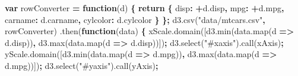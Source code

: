 \documentclass[openany]{book}
\newenvironment{Shaded}{\begin{snugshade}}{\end{snugshade}}
\newcommand{\AttributeTok}[1]{\textcolor[rgb]{0.77,0.63,0.00}{#1}}
\newcommand{\ControlFlowTok}[1]{\textcolor[rgb]{0.13,0.29,0.53}{\textbf{#1}}}
\newcommand{\DataTypeTok}[1]{\textcolor[rgb]{0.13,0.29,0.53}{#1}}
\newcommand{\KeywordTok}[1]{\textcolor[rgb]{0.13,0.29,0.53}{\textbf{#1}}}
\newcommand{\NormalTok}[1]{#1}
\newcommand{\OperatorTok}[1]{\textcolor[rgb]{0.81,0.36,0.00}{\textbf{#1}}}
\newcommand{\StringTok}[1]{\textcolor[rgb]{0.31,0.60,0.02}{#1}}
\newcommand{\VariableTok}[1]{\textcolor[rgb]{0.00,0.00,0.00}{#1}}
\begin{document}
\begin{Shaded}
\begin{Highlighting}[]
\KeywordTok{var}\NormalTok{ rowConverter }\OperatorTok{=} \KeywordTok{function}\NormalTok{(d) }\OperatorTok{\{}
  \ControlFlowTok{return} \OperatorTok{\{}
    \DataTypeTok{disp}\OperatorTok{:} \OperatorTok{+}\VariableTok{d}\NormalTok{.}\AttributeTok{disp}\OperatorTok{,}
    \DataTypeTok{mpg}\OperatorTok{:} \OperatorTok{+}\VariableTok{d}\NormalTok{.}\AttributeTok{mpg}\OperatorTok{,}
    \DataTypeTok{carname}\OperatorTok{:} \VariableTok{d}\NormalTok{.}\AttributeTok{carname}\OperatorTok{,}
    \DataTypeTok{cylcolor}\OperatorTok{:} \VariableTok{d}\NormalTok{.}\AttributeTok{cylcolor}
  \OperatorTok{\}}
\OperatorTok{\};}
\VariableTok{d3}\NormalTok{.}\AttributeTok{csv}\NormalTok{(}\StringTok{"data/mtcars.csv"}\OperatorTok{,}\NormalTok{ rowConverter)}
\NormalTok{  .}\AttributeTok{then}\NormalTok{(}\KeywordTok{function}\NormalTok{(data) }\OperatorTok{\{}
    \VariableTok{xScale}\NormalTok{.}\AttributeTok{domain}\NormalTok{([}\VariableTok{d3}\NormalTok{.}\AttributeTok{min}\NormalTok{(}\VariableTok{data}\NormalTok{.}\AttributeTok{map}\NormalTok{(d }\OperatorTok{=>} \VariableTok{d}\NormalTok{.}\AttributeTok{disp}\NormalTok{))}\OperatorTok{,} \VariableTok{d3}\NormalTok{.}\AttributeTok{max}\NormalTok{(}\VariableTok{data}\NormalTok{.}\AttributeTok{map}\NormalTok{(d }\OperatorTok{=>} \VariableTok{d}\NormalTok{.}\AttributeTok{disp}\NormalTok{))])}\OperatorTok{;}
    \VariableTok{d3}\NormalTok{.}\AttributeTok{select}\NormalTok{(}\StringTok{"#xaxis"}\NormalTok{).}\AttributeTok{call}\NormalTok{(xAxis)}\OperatorTok{;}
    \VariableTok{yScale}\NormalTok{.}\AttributeTok{domain}\NormalTok{([}\VariableTok{d3}\NormalTok{.}\AttributeTok{min}\NormalTok{(}\VariableTok{data}\NormalTok{.}\AttributeTok{map}\NormalTok{(d }\OperatorTok{=>} \VariableTok{d}\NormalTok{.}\AttributeTok{mpg}\NormalTok{))}\OperatorTok{,} \VariableTok{d3}\NormalTok{.}\AttributeTok{max}\NormalTok{(}\VariableTok{data}\NormalTok{.}\AttributeTok{map}\NormalTok{(d }\OperatorTok{=>} \VariableTok{d}\NormalTok{.}\AttributeTok{mpg}\NormalTok{))])}\OperatorTok{;}
    \VariableTok{d3}\NormalTok{.}\AttributeTok{select}\NormalTok{(}\StringTok{"#yaxis"}\NormalTok{).}\AttributeTok{call}\NormalTok{(yAxis)}\OperatorTok{;}


\end{Highlighting}
\end{Shaded}
\end{document}
